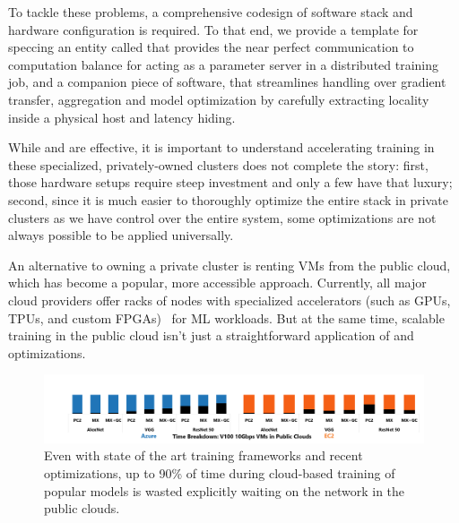 To tackle these problems, a comprehensive codesign of software stack and hardware configuration is required. To that end, we provide a template for speccing an entity called \pbox that provides the near perfect communication to computation balance for acting as a parameter server in a distributed training job, and a companion piece of software, \phub that streamlines handling over gradient  transfer, aggregation and model optimization by carefully extracting locality inside a physical host and latency hiding. 

While \pbox and \phub are effective, it is important to understand accelerating training in these specialized, privately-owned clusters does not complete the story: first, those hardware setups require steep investment and only a few have that luxury; second, since it is much easier to thoroughly optimize the entire stack in private clusters as we have control over the entire system, some optimizations are not always possible to be applied universally.

An alternative to owning a private cluster is renting VMs from the public cloud, which has become a popular, more accessible approach. Currently, all major cloud providers offer racks of nodes with specialized accelerators (such as GPUs, TPUs, and custom FPGAs)~\cite{GoogleCl74:online,MachineL50:online,DeepLear23:online,sagemaker,brainwave,Jouppi:2017:IPA:3079856.3080246,222611} for ML workloads. But at the same time, scalable training in the public cloud isn't just a straightforward application of \pbox and \phub optimizations.

\begin{figure}[t!]
	\centering
	\includegraphics[width=.9\linewidth, trim=6 1 3 3,clip]{Figures/cloudoverhead.png}
	\caption{Even with state of the art training frameworks and recent optimizations, up to 90\% of time during cloud-based training of popular models is wasted explicitly waiting on the network in the public clouds.}
	\label{fig:cloudOverhead}
\end{figure}


